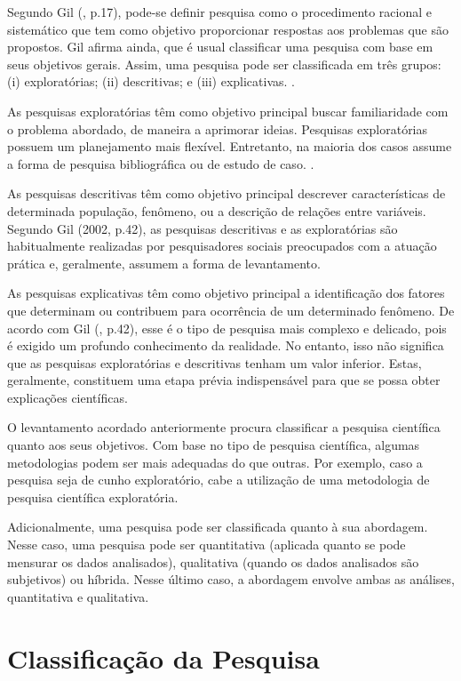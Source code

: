 Segundo Gil (\citeyear{gil2002}, p.17), pode-se definir pesquisa como o procedimento racional e sistemático que tem como objetivo proporcionar respostas aos problemas que são propostos. Gil afirma ainda, que é usual classificar uma pesquisa com base em seus objetivos gerais. Assim, uma pesquisa pode ser classificada em três grupos: (i) exploratórias; (ii) descritivas; e (iii) explicativas. \cite[p. 41]{gil2002}.

As pesquisas exploratórias têm como objetivo principal buscar familiaridade com o problema abordado, de maneira a aprimorar ideias.  Pesquisas exploratórias possuem um planejamento mais flexível. Entretanto, na maioria dos casos assume a forma de pesquisa bibliográfica ou de estudo de caso. \cite[p. 41]{gil2002}.

As pesquisas descritivas têm como objetivo principal descrever características de determinada população, fenômeno, ou a descrição de relações entre variáveis. Segundo Gil (2002, p.42), as pesquisas descritivas e as exploratórias são habitualmente realizadas por pesquisadores sociais preocupados com a atuação prática e, geralmente, assumem a forma de levantamento.

As pesquisas explicativas têm como objetivo principal a identificação dos fatores que determinam ou contribuem para ocorrência de um determinado fenômeno. De acordo com Gil (\citeyear{gil2002}, p.42), esse é o tipo de pesquisa mais complexo e delicado, pois é exigido um profundo conhecimento da realidade. No entanto, isso não significa que as pesquisas exploratórias e descritivas tenham um valor inferior. Estas, geralmente, constituem uma etapa prévia indispensável para que se possa obter explicações científicas. 

O levantamento acordado anteriormente procura classificar a pesquisa científica quanto aos seus objetivos. Com base no tipo de pesquisa científica, algumas metodologias podem ser mais adequadas do que outras. Por exemplo, caso a pesquisa seja de cunho exploratório, cabe a utilização de uma metodologia de pesquisa científica exploratória. 

Adicionalmente, uma pesquisa pode ser classificada quanto à sua abordagem. Nesse caso, uma pesquisa pode ser quantitativa (aplicada quanto se pode mensurar os dados analisados), qualitativa (quando os dados analisados são subjetivos) ou híbrida. Nesse último caso, a abordagem envolve ambas as análises, quantitativa e qualitativa.

\section{Classificação da Pesquisa }

